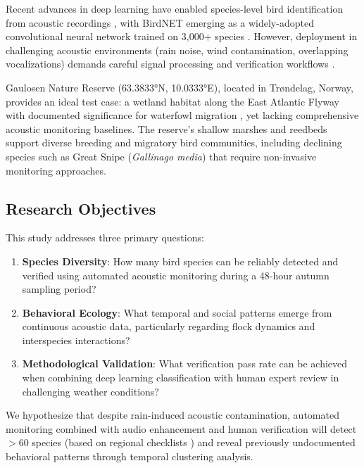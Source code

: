 \documentclass[twocolumn]{article}
\begin{document}
Recent advances in deep learning have enabled species-level bird identification from acoustic recordings \citep{Kahl2021}, with BirdNET emerging as a widely-adopted convolutional neural network trained on 3,000+ species \citep{Wood2022}. However, deployment in challenging acoustic environments (rain noise, wind contamination, overlapping vocalizations) demands careful signal processing and verification workflows \citep{Stowell2019}.

Gaulosen Nature Reserve (63.3833°N, 10.0333°E), located in Trøndelag, Norway, provides an ideal test case: a wetland habitat along the East Atlantic Flyway with documented significance for waterfowl migration \citep{Kålås1995}, yet lacking comprehensive acoustic monitoring baselines. The reserve's shallow marshes and reedbeds support diverse breeding and migratory bird communities, including declining species such as Great Snipe (\textit{Gallinago media}) that require non-invasive monitoring approaches.

\subsection{Research Objectives}

This study addresses three primary questions:

\begin{enumerate}
\item \textbf{Species Diversity}: How many bird species can be reliably detected and verified using automated acoustic monitoring during a 48-hour autumn sampling period?

\item \textbf{Behavioral Ecology}: What temporal and social patterns emerge from continuous acoustic data, particularly regarding flock dynamics and interspecies interactions?

\item \textbf{Methodological Validation}: What verification pass rate can be achieved when combining deep learning classification with human expert review in challenging weather conditions?
\end{enumerate}

We hypothesize that despite rain-induced acoustic contamination, automated monitoring combined with audio enhancement and human verification will detect $>$60 species (based on regional checklists \citep{Artsdatabanken2023}) and reveal previously undocumented behavioral patterns through temporal clustering analysis.
\end{document}
